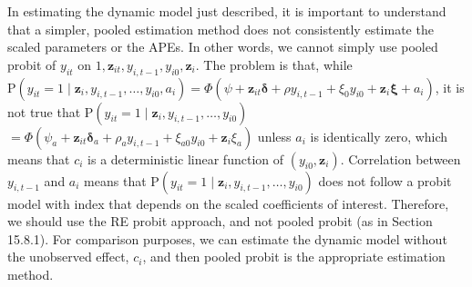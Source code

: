 \documentclass[10pt]{article}
\begin{document}
In estimating the dynamic model just described, it is important to understand that a simpler, pooled estimation method does not consistently estimate the scaled parameters or the APEs. In other words, we cannot simply use pooled probit of $y_{i t}$ on $1, \mathbf{z}_{i t}, y_{i, t-1}, y_{i 0}, \mathbf{z}_{i}$. The problem is that, while $\mathrm{P}\left(y_{i t}=1 \mid \mathbf{z}_{i}, y_{i, t-1}, \ldots, y_{i 0}, a_{i}\right)= \Phi\left(\psi+\mathbf{z}_{i t} \boldsymbol{\delta}+\rho y_{i, t-1}+\xi_{0} y_{i 0}+\mathbf{z}_{i} \boldsymbol{\xi}+a_{i}\right)$, it is not true that $\mathrm{P}\left(y_{i t}=1 \mid \mathbf{z}_{i}, y_{i, t-1}, \ldots, y_{i 0}\right)$\\
$=\Phi\left(\psi_{a}+\mathbf{z}_{i t} \boldsymbol{\delta}_{a}+\rho_{a} y_{i, t-1}+\xi_{a 0} y_{i 0}+\mathbf{z}_{i} \xi_{a}\right)$ unless $a_{i}$ is identically zero, which means that $c_{i}$ is a deterministic linear function of $\left(y_{i 0}, \mathbf{z}_{i}\right)$. Correlation between $y_{i, t-1}$ and $a_{i}$ means that $\mathrm{P}\left(y_{i t}=1 \mid \mathbf{z}_{i}, y_{i, t-1}, \ldots, y_{i 0}\right)$ does not follow a probit model with index that depends on the scaled coefficients of interest. Therefore, we should use the RE probit approach, and not pooled probit (as in Section 15.8.1). For comparison purposes, we can estimate the dynamic model without the unobserved effect, $c_{i}$, and then pooled probit is the appropriate estimation method.
\end{document}
